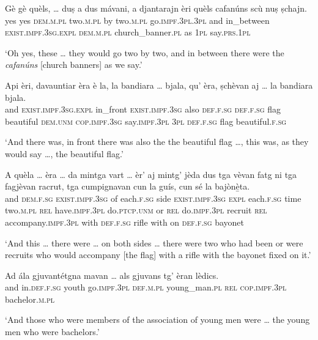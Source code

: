 \begin{linenumbers}
	\gll    Gè gè quèls, … duṣ a dus mávani, a djantarajn èri quèls cafanúns scù nuṣ ṣchajn. \\
	yes yes \textsc{dem.m.pl} {} two.\textsc{m.pl} by two.\textsc{m.pl}  go.\textsc{impf.3pl.3pl} and in\_between \textsc{exist.impf.3sg.expl}  \textsc{dem.m.pl} church\_banner.\textsc{pl} as \textsc{1pl} say.\textsc{prs.1pl} \\
\end{linenumbers}
\medskip
\glt `Oh yes, these … they would go two by two, and in between there were the \textit{cafanúns} [church banners] as we say.'
\medskip

\begin{linenumbers}
	\gll Api èri, davauntiar èra è la, la bandiara … bjala, qu’ èra, ṣchèvan aj … la bandiara bjala. \\
	and \textsc{exist.impf.3sg.expl} in\_front \textsc{exist.impf.3sg} also \textsc{def.f.sg} \textsc{def.f.sg} flag {} beautiful \textsc{dem.unm} \textsc{cop.impf.3sg} say.\textsc{impf.3pl}  \textsc{3pl} {} \textsc{def.f.sg} flag beautiful.\textsc{f.sg}\\
\end{linenumbers}
\medskip
\glt `And there was, in front there was also the the beautiful flag …, this was, as they would say …, the beautiful flag.'
\medskip

\begin{linenumbers}
	\gll    A quèla … èra … da mintga vart … èr’ aj mintg’ jèda dus tga vèvan fatg ni tga fagjèvan racrut, tga cumpignavan cun la guís, cun sé la bajònè̱ta.\\
	and \textsc{dem.f.sg} {} \textsc{exist.impf.3sg} {} of each.\textsc{f.sg} side {} \textsc{exist.impf.3sg} \textsc{expl} each.\textsc{f.sg} time two.\textsc{m.pl} \textsc{rel} have.\textsc{impf.3pl} do.\textsc{ptcp.unm} or \textsc{rel} do.\textsc{impf.3pl} recruit \textsc{rel} accompany.\textsc{impf.3pl} with  \textsc{def.f.sg} rifle with on  \textsc{def.f.sg} bayonet\\
\end{linenumbers}
\medskip
\glt `And this … there were … on both sides … there were two who had been or were recruits who would accompany [the flag] with a rifle with the bayonet fixed on it.'
\medskip

\begin{linenumbers}
	\gll    Ad ála gjuvantétgna mavan … als gjuvans tg’ èran lèdics.\\
	and in.\textsc{def.f.sg} youth go.\textsc{impf.3pl} {} \textsc{def.m.pl} young\_man.\textsc{pl} \textsc{rel} \textsc{cop.impf.3pl} bachelor.\textsc{m.pl}\\
\end{linenumbers}
\medskip
\glt `And those who were members of the association of young men were … the young men who were bachelors.'
\medskip

